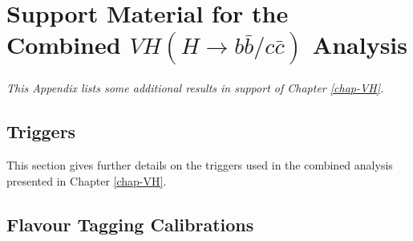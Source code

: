 \chapter{Support Material for the Combined $VH(H\rightarrow b\bar{b}/c\bar{c})$ Analysis}
\textit{This Appendix lists some additional results in support of Chapter \ref{chap-VH}.}

\section{Triggers}\label{appsec-trigger}
This section gives further details on the triggers used in the combined analysis presented in Chapter \ref{chap-VH}.


\section{Flavour Tagging Calibrations}\label{appsec-vh-ftagcal}
